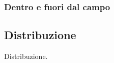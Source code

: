 \subsubsection*{Dentro e fuori dal campo}
%
\label{sec:analisi_concorrenza_uscita_campo}



\subsection*{Distribuzione}
%
\label{sec:analisi_distribuzione}

Distribuzione.


